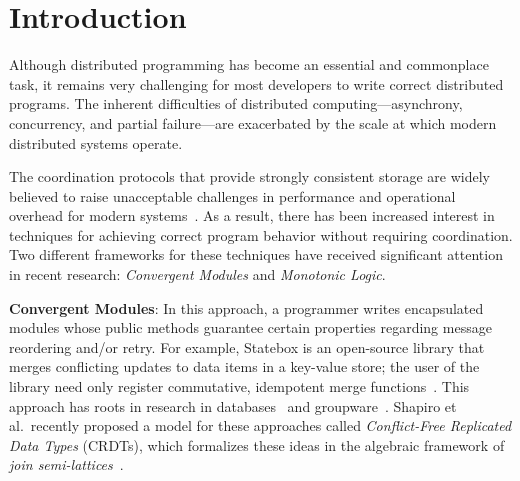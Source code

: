 \section{Introduction} 
\label{sec:intro} 
Although distributed programming has become an essential and commonplace task,
it remains very challenging for most developers to write correct distributed
programs. The inherent difficulties of distributed computing---asynchrony,
concurrency, and partial failure---are exacerbated by the scale at which modern
distributed systems operate.

The coordination protocols that provide strongly consistent storage are widely believed to raise unacceptable challenges in performance and operational overhead for modern systems~\cite{Birman2009}. As a result, 
there has been increased interest in techniques for achieving correct program behavior without requiring coordination. 
Two different frameworks for these techniques have received significant attention in recent research:
\emph{Convergent Modules} and \emph{Monotonic Logic}.  

\vspace{0.5em}\noindent
\textbf{Convergent Modules}: In this approach, a programmer writes encapsulated
modules whose public methods guarantee certain properties regarding
message reordering and/or retry. For example, Statebox is an open-source library
that merges conflicting updates to data items in a key-value store; the user of
the library need only register commutative, idempotent merge
functions~\cite{statebox}. This approach has roots in research in
databases~\cite{Farrag1989,Garcia-Molina1983,Helland2009} and
groupware~\cite{Ellis1989,Sun1998}.  Shapiro et al.\ recently proposed a model
for these approaches called \emph{Conflict-Free Replicated Data Types} (CRDTs),
which formalizes these ideas in the algebraic framework of {\em join semi-lattices}~\cite{Shapiro2011b}.

